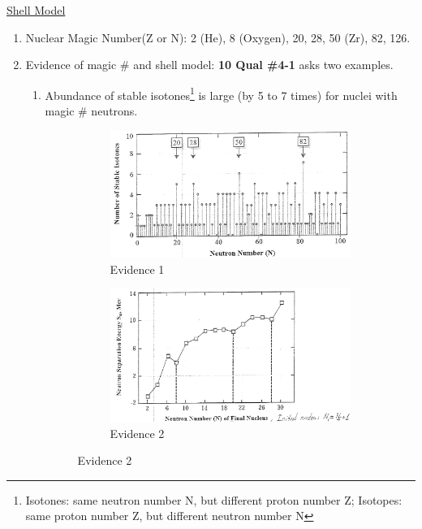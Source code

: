 \documentclass{school-22.101-notes}
\date{December 16, 2011}
\begin{document}
\maketitle


\clearpage
{}
\uline{Shell Model}
\begin{enumerate}
\item Nuclear Magic Number(Z or N): 2 (He), 8 (Oxygen), 20, 28, 50 (Zr), 82, 126. 
\item Evidence of magic \# and shell model: \textbf{10 Qual \#4-1} asks two examples.
\begin{enumerate}
\item Abundance of stable isotones\footnote{Isotones: same neutron number N, but different proton number Z; Isotopes: same proton number Z, but different neutron number N} is large (by 5 to 7 times) for nuclei with magic \# neutrons.
\begin{figure}[ht]
  \centering
  \begin{subfigure}[b]{0.45\textwidth}
    \centering
    \includegraphics[width=\textwidth]{images/shell/shell-evidence-1.png}
    \caption{Evidence 1}
    \label{fig:111}
  \end{subfigure}
  \begin{subfigure}[b]{0.45\textwidth}
    \centering
    \includegraphics[width=\textwidth]{images/shell/shell-evidence-2.png}
    \caption{Evidence 2}
    \label{fig:111}
  \end{subfigure}
\end{figure}


\end{enumerate}
\end{enumerate}
\end{document}
